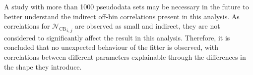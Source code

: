 A study with more than 1000 pseudodata sets may be necessary in the future to better understand the indirect off-bin correlations present in this analysis.
As correlations for ${\mathcal{N}_{\mathrm{CB}}}_{i,j}$ are observed as small and indirect, they are not considered to significantly affect the result in this analysis.
Therefore, it is concluded that no unexpected behaviour of the fitter is observed, with correlations between different parameters explainable through the differences in the \PDF shape they introduce.
